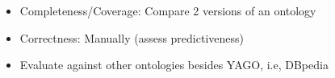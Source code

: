 \begin{itemize}
 \item Completeness/Coverage: Compare 2 versions of an ontology
 \item Correctness: Manually  (assess predictiveness)
 \item Evaluate against other ontologies besides YAGO, i.e, DBpedia
\end{itemize}